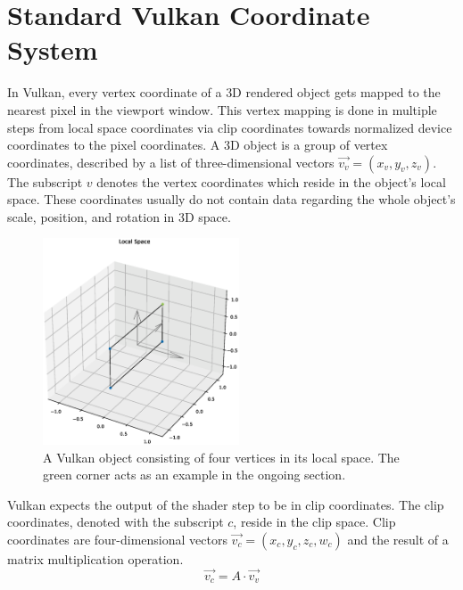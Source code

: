 \section{Standard Vulkan Coordinate System}
\label{sec:VulkanCoords}
In Vulkan, every vertex coordinate of a 3D rendered object gets mapped to the nearest pixel in the viewport window. This vertex mapping is done in multiple steps from local space coordinates via clip coordinates towards normalized device coordinates to the pixel coordinates.
A 3D object is a group of vertex coordinates, described by a list of three-dimensional vectors $\vec{v_{v}} = (x_{v},y_{v},z_{v})$. The subscript $v$ denotes the vertex coordinates which reside in the object's local space. These coordinates usually do not contain data regarding the whole object's scale, position, and rotation in 3D space.
\begin{figure}[H]
    \centering
    \includegraphics[width=0.52\textwidth]{images/Vulkan_local_space.eps}
    \caption{A Vulkan object consisting of four vertices in its local space. The green corner acts as an example in the ongoing section.}
    \label{im:VulkanLocalSpace}
\end{figure}
Vulkan expects the output of the shader step to be in clip coordinates. The clip coordinates, denoted with the subscript $c$, reside in the clip space. Clip coordinates are four-dimensional vectors $\vec{v_{c}} = (x_{c},y_{c},z_{c},w_{c})$ and the result of a matrix multiplication operation.\\
\begin{equation*}
    \vec{v_{c}} = A \cdot  \vec{v_{v}}
\end{equation*}
